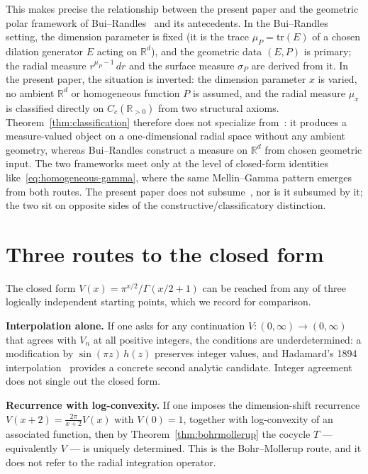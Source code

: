 \documentclass[11pt,a4paper]{article}
\theoremstyle{plain}
\theoremstyle{definition}
\theoremstyle{remark}
\newcommand{\R}{\mathbb{R}}
\newcommand{\Cc}{C_c}
\begin{document}
This makes precise the relationship between the present paper and the geometric polar framework of Bui--Randles~\cite{BuiRandles2022} and its antecedents. In the Bui--Randles setting, the dimension parameter is fixed (it is the trace $\mu_P=\mathrm{tr}(E)$ of a chosen dilation generator $E$ acting on $\R^d$), and the geometric data $(E,P)$ is primary; the radial measure $r^{\mu_P-1}\,dr$ and the surface measure $\sigma_P$ are derived from it. In the present paper, the situation is inverted: the dimension parameter $x$ is varied, no ambient $\R^d$ or homogeneous function $P$ is assumed, and the radial measure $\mu_x$ is classified directly on $\Cc(\R_{>0})$ from two structural axioms. Theorem~\ref{thm:classification} therefore does not specialize from~\cite{BuiRandles2022}: it produces a measure-valued object on a one-dimensional radial space without any ambient geometry, whereas Bui--Randles construct a measure on $\R^d$ from chosen geometric input. The two frameworks meet only at the level of closed-form identities like~\eqref{eq:homogeneous-gamma}, where the same Mellin--Gamma pattern emerges from both routes. The present paper does not subsume~\cite{BuiRandles2022}, nor is it subsumed by it; the two sit on opposite sides of the constructive/classificatory distinction.

\section{Three routes to the closed form}\label{sec:summary}

The closed form $V(x) = \pi^{x/2}/\Gamma(x/2+1)$ can be reached from any of three logically independent starting points, which we record for comparison.

\smallskip
\noindent\textbf{Interpolation alone.} If one asks for any continuation $V\colon(0,\infty)\to(0,\infty)$ that agrees with $V_n$ at all positive integers, the conditions are underdetermined: a modification by $\sin(\pi z)\,h(z)$ preserves integer values, and Hadamard's 1894 interpolation~\cite{Hadamard1894} provides a concrete second analytic candidate. Integer agreement does not single out the closed form.

\smallskip
\noindent\textbf{Recurrence with log-convexity.} If one imposes the dimension-shift recurrence $V(x+2) = \frac{2\pi}{x+2}V(x)$ with $V(0)=1$, together with log-convexity of an associated function, then by Theorem~\ref{thm:bohrmollerup} the cocycle $T$ — equivalently $V$ — is uniquely determined. This is the Bohr--Mollerup route, and it does not refer to the radial integration operator.
\end{document}
